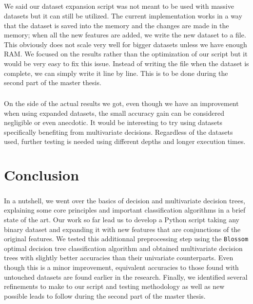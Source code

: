 \documentclass[12pt]{report}
\theoremstyle{definition}
\theoremstyle{definition}
\theoremstyle{definition}
\begin{document}
\paragraph{} We said our dataset expansion script was not meant to be used with massive datasets but it can still
be utilized. The current implementation works in a way that the dataset is saved into the memory and the changes are
made in the memory; when all the new features are added, we write the new dataset to a file. This obviously does not
scale very well for bigger datasets unless we have enough RAM. We focused on the results rather than the optimization
of our script but it would be very easy to fix this issue. Instead of writing the file when the dataset is complete,
we can simply write it line by line. This is to be done during the second part of the master thesis.

\paragraph{} On the side of the actual results we got, even though we have an improvement when using expanded datasets,
the small accuracy gain can be considered negligible or even anecdotic. It would be interesting to try using datasets
specifically benefiting from multivariate decisions. Regardless of the datasets used, further testing is needed using
different depths and longer execution times.



\chapter*{Conclusion}
\paragraph{} In a nutshell, we went over the basics of decision and multivariate decision trees, explaining some core
principles and important classification algorithms in a brief state of the art. Our work so far lead us to develop
a Python script taking any binary dataset and expanding it with new features that are conjunctions of the original
features. We tested this additionnal preprocessing step using the \texttt{Blossom} optimal decision tree classification
algorithm and obtained multivariate decision trees with slightly better accuracies than their univariate counterparts.
Even though this is a minor improvement, equivalent accuracies to those found with untouched datasets are found earlier
in the research. Finally, we identified several refinements to make to our script and testing methodology as well as
new possible leads to follow during the second part of the master thesis.
\end{document}
